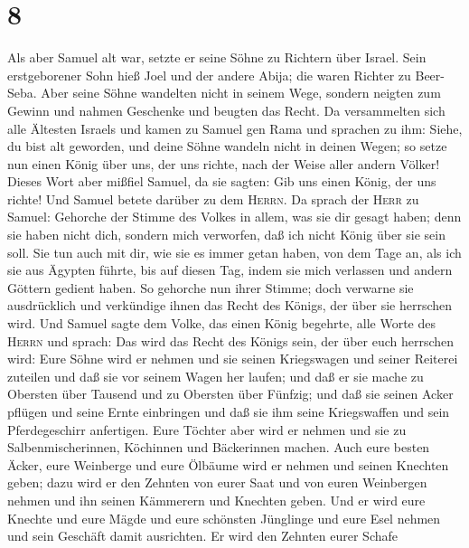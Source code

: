 \hypertarget{section-7}{%
\section{8}\label{section-7}}

 Als aber Samuel alt war, setzte er seine Söhne zu
Richtern über Israel.  Sein erstgeborener Sohn hieß Joel
und der andere Abija; die waren Richter zu Beer-Seba. 
Aber seine Söhne wandelten nicht in seinem Wege, sondern neigten zum
Gewinn und nahmen Geschenke und beugten das Recht.  Da
versammelten sich alle Ältesten Israels und kamen zu Samuel gen Rama
 und sprachen zu ihm: Siehe, du bist alt geworden, und
deine Söhne wandeln nicht in deinen Wegen; so setze nun einen König über
uns, der uns richte, nach der Weise aller andern Völker! 
Dieses Wort aber mißfiel Samuel, da sie sagten: Gib uns einen König, der
uns richte! Und Samuel betete darüber zu dem \textsc{Herrn}.
 Da sprach der \textsc{Herr} zu Samuel: Gehorche der
Stimme des Volkes in allem, was sie dir gesagt haben; denn sie haben
nicht dich, sondern mich verworfen, daß ich nicht König über sie sein
soll.  Sie tun auch mit dir, wie sie es immer getan haben,
von dem Tage an, als ich sie aus Ägypten führte, bis auf diesen Tag,
indem sie mich verlassen und andern Göttern gedient haben.
 So gehorche nun ihrer Stimme; doch verwarne sie
ausdrücklich und verkündige ihnen das Recht des Königs, der über sie
herrschen wird.  Und Samuel sagte dem Volke, das einen
König begehrte, alle Worte des \textsc{Herrn}  und
sprach: Das wird das Recht des Königs sein, der über euch herrschen
wird: Eure Söhne wird er nehmen und sie seinen Kriegswagen und seiner
Reiterei zuteilen und daß sie vor seinem Wagen her laufen;
 und daß er sie mache zu Obersten über Tausend und zu
Obersten über Fünfzig; und daß sie seinen Acker pflügen und seine Ernte
einbringen und daß sie ihm seine Kriegswaffen und sein Pferdegeschirr
anfertigen.  Eure Töchter aber wird er nehmen und sie zu
Salbenmischerinnen, Köchinnen und Bäckerinnen machen. 
Auch eure besten Äcker, eure Weinberge und eure Ölbäume wird er nehmen
und seinen Knechten geben;  dazu wird er den Zehnten von
eurer Saat und von euren Weinbergen nehmen und ihn seinen Kämmerern und
Knechten geben.  Und er wird eure Knechte und eure Mägde
und eure schönsten Jünglinge und eure Esel nehmen und sein Geschäft
damit ausrichten.  Er wird den Zehnten eurer Schafe
